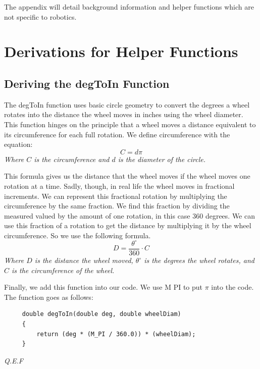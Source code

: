 \documentclass[12pt]{report}
\begin{document}
%
%
\newpage
\appendix
The appendix will detail background information and helper functions which are not specific to robotics.
\chapter{Derivations for Helper Functions}
\section{Deriving the degToIn Function} \label{app_degToIn}
    The degToIn function uses basic circle geometry to convert the degrees a wheel rotates into the distance the wheel moves in inches using the wheel diameter.
    This function hinges on the principle that a wheel moves a distance equivalent to its circumference for each full rotation. 
    We define circumference with the equation:
    $$ C = d\pi $$
    \center\textit{Where $C$ is the circumference and $d$ is the diameter of the circle.}

    \raggedright
    This formula gives us the distance that the wheel moves if the wheel moves one rotation at a time.
    Sadly, though, in real life the wheel moves in fractional increments.
    We can represent this fractional rotation by multiplying the circumference by the same fraction.
    We find this fraction by dividing the measured valued by the amount of one rotation, in this case 360 degrees.
    We can use this fraction of a rotation to get the distance by multiplying it by the wheel circumference.
    So we use the following formula.
    $$ D = \frac{\theta^\circ}{360} \cdot C $$
    \center\textit{Where $D$ is the distance the wheel moved, $\theta^\circ$ is the degrees the wheel rotates, and $C$ is the circumference of the wheel.}

    \raggedright
    Finally, we add this function into our code.
    We use M PI to put $\pi$ into the code.
    The function goes as follows:

    \begin{verbatim}
     double degToIn(double deg, double wheelDiam)
     {
         return (deg * (M_PI / 360.0)) * (wheelDiam);
     }
    \end{verbatim}

    \textit{Q.E.F}

    \pagebreak
\end{document}
